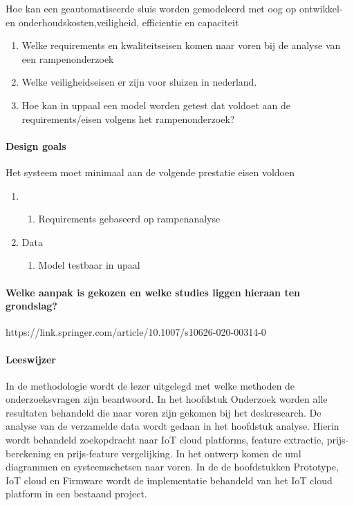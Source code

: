Hoe kan een geautomatiseerde sluis worden gemodeleerd met oog op ontwikkel- en onderhoudskosten,veiligheid, efficientie en capaciteit





\begin{enumerate}
	
	\item Welke requirements en kwaliteitseisen komen naar voren bij de analyse van een rampenonderzoek
	\item Welke veiligheidseisen er zijn voor sluizen in nederland. 
	\item Hoe kan in uppaal  een model worden getest dat voldoet aan de requirements/eisen volgens het rampenonderzoek?
\end{enumerate}



\paragraph{Design goals}
Het systeem moet minimaal aan de volgende prestatie eisen voldoen 

\begin{enumerate}
	\item  
	\begin{enumerate}
		\item Requirements gebaseerd op rampenanalyse
	\end{enumerate}
	\item Data
	\begin{enumerate}
		\item Model testbaar in upaal
	\end{enumerate}
	
\end{enumerate}

\paragraph{Welke aanpak is gekozen en welke studies liggen hieraan ten grondslag?}
https://link.springer.com/article/10.1007/s10626-020-00314-0

\paragraph{Leeswijzer}
In  de methodologie wordt de lezer uitgelegd met welke methoden de onderzoeksvragen zijn beantwoord. In het hoofdstuk Onderzoek worden alle resultaten behandeld die naar voren zijn gekomen bij het deskresearch. De analyse van de verzamelde data wordt gedaan in het hoofdstuk analyse. Hierin wordt behandeld zoekopdracht naar IoT cloud platforms, feature extractie, prijs-berekening en prijs-feature vergelijking. In het ontwerp komen de uml diagrammen en systeemschetsen naar voren. In de  de hoofdstukken Prototype, IoT cloud en Firmware wordt de implementatie behandeld van het IoT cloud platform in een bestaand project.




